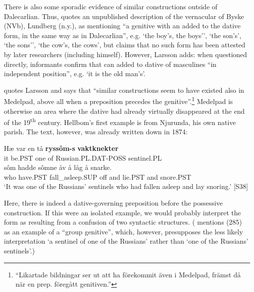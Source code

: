 
There is also some sporadic evidence of similar constructions outside of Dalecarlian. Thus, \citet[124]{Larsson1929} quotes an unpublished description of the vernacular of Byske (NVb), Lundberg (n.y.), as mentioning “a genitive with an  added to the dative form, in the same way as in Dalecarlian”, e.g.  ‘the boy’s, the boys’’,  ‘the son’s’,  ‘the sons’’,  ‘the cow’s, the cows’, but claims that no such form has been attested by later researchers (including himself). However, Larsson adds: when questioned directly, informants confirm that  can added to dative of masculines “in independent position”, e.g.  ‘it is the old man’s’. 


\citet[126]{Hellbom1961} quotes Larsson and says that “similar constructions seem to have existed also in Medelpad, above all when a preposition precedes the genitive”.\footnote{ “Likartade bildningar ser ut att ha förekommit även i Medelpad, främst då när en prep. föregått genitiven.”} Medelpad is otherwise an area where the dative had already virtually disappeared at the end of the 19\textsuperscript{th} century. Hellbom’s first example is from Njurunda, his own native parish. The text, however, was already written down in 1874:


\ea\label{}
\gll Hæ  var  en  tå  \textbf{ryssôm-s} \textbf{vaktknekter}\\
it  be.PST  one  of  Russian.PL.DAT-POSS  sentinel.PL\\
\gll sôm  hadde  sômne  åv  å  låg  å  snarke.\\
who  have.PST  fall\_asleep.SUP  off  and  lie.PST  and  snore.PST\\
\glt  ‘It was one of the Russians’ sentinels who had fallen asleep and lay snoring.’ [S38]
\z

Here, there is indeed a dative-governing preposition before the possessive construction. If this were an isolated example, we would probably interpret the form  as resulting from a confusion of two syntactic structures. (\citet[38]{Delsing2003a} mentions (285) as an example of a “group genitive”, which, however, presupposes the less likely interpretation ‘a sentinel of one of the Russians’ rather than ‘one of the Russians’ sentinels’.) 

